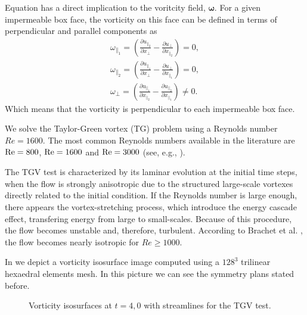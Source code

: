 Equation  has a direct implication to the voritcity field, $\boldsymbol{\omega}$. For a given impermeable box face, the vorticity on this face can be defined in terms of perpendicular and parallel components as
\begin{align}
\label{eq-TGV_vorticity}
\omega_{\parallel_1}=\left(\frac{\partial u_{\parallel_2}}{\partial x_\perp}-\frac{\partial u_\perp}{\partial x_{\parallel_2}}\right)=0,\\\nonumber
\omega_{\parallel_2}=\left(\frac{\partial u_{\parallel_1}}{\partial x_\perp}-\frac{\partial u_\perp}{\partial x_{\parallel_1}}\right)=0,\\\nonumber
\omega_\perp=\left(\frac{\partial u_{\parallel_1}}{\partial x_{\parallel_2}}-\frac{\partial u_{\parallel_2}}{\partial x_{\parallel_1}}\right)\neq0.
\end{align}
Which means that the vorticity is perpendicular to each impermeable box face.

We solve the Taylor-Green vortex (TG) problem using a Reynolds number $Re=1600$. The most common Reynolds numbers available in the literature are ${\rm Re}=800$, ${\rm Re}=1600$ and ${\rm Re}=3000$ (see, e.g., \cite{andrea_d._beck_numerical_2012, fauconnier_construction_2009, gassner_accuracy_????, jb_chapelier_final_2012}).

The TGV test is characterized by its laminar evolution at the initial time steps, when the flow is strongly anisotropic due to the structured large-scale vortexes directly related to the initial condition. If the Reynolds number is large enough, there appears the vortex-stretching process, which introduce the energy cascade effect, transfering energy from large to small-scales. Because of this procedure, the flow becomes unstable and, therefore, turbulent. According to Brachet et al. \cite{brachet_small-scale_1983}, the flow becomes nearly isotropic for $Re\geq1000$.

In  we depict a vorticity isosurface image computed using a $128^3$ trilinear hexaedral elements mesh. In this picture we can see the symmetry plans stated before.

\begin{figure}[h!]
	\centering	
	\caption{Vorticity isosurfaces at $t=4,0$ with streamlines for the TGV test.}
	\label{fig-TGV_vorticity_streamlines}
\end{figure}

